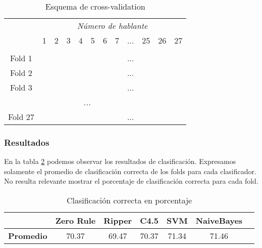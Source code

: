 \begin{table}[H]
	\centering
	\begin{tabular}{cccccccccccc}
		& \multicolumn{11}{c}{\textit{Número de hablante}} \\
		& 1 & 2 & 3 & 4 & 5 & 6 & 7 & ... & 25 & 26 & 27 \\
		\hline \\
		Fold 1 &\mycirc[red] & \mycirc[blue] & \mycirc[blue]  & \mycirc[blue]  & \mycirc[blue]  & \mycirc[blue]  & \mycirc[blue] & ... & \mycirc[blue] & \mycirc[blue] & \mycirc[blue]  \\
		
		Fold 2 &\mycirc[blue] & \mycirc[red] & \mycirc[blue]  & \mycirc[blue]  & \mycirc[blue]  & \mycirc[blue]  & \mycirc[blue] & ... & \mycirc[blue] & \mycirc[blue] & \mycirc[blue]  \\
		
		Fold 3 &\mycirc[blue] & \mycirc[blue] & \mycirc[red]  & \mycirc[blue]  & \mycirc[blue]  & \mycirc[blue]  & \mycirc[blue] & ... & \mycirc[blue] & \mycirc[blue] & \mycirc[blue]  \\
	
		\multicolumn{11}{c}{\textit{...}}	\\
		
		Fold 27 &\mycirc[blue] & \mycirc[blue] & \mycirc[blue]  & \mycirc[blue]  & \mycirc[blue]  & \mycirc[blue]  & \mycirc[blue] & ... & \mycirc[blue] & \mycirc[blue] & \mycirc[red]   \\
	
	\end{tabular}
	\caption{Esquema de cross-validation}
	\label{HPTDT_esq_cv}
\end{table}
		
\subsubsection{Resultados}

En la tabla \ref{HPTDT_clas_xval_porHab} podemos observar los resultados de clasificación. Expresamos solamente el promedio de clasificación correcta de los folds para cada clasificador. No resulta relevante mostrar el porcentaje de clasificación correcta para cada fold. 

\begin{table}[H]
	\centering
	\begin{tabular}{|l|c|c|c|c|c|c|}
		\hline
		\textbf{}  & \textbf{Zero Rule} & \textbf{Ripper} & \textbf{C4.5} & \textbf{SVM} & \textbf{NaiveBayes} \\ \hline
		\textbf{Promedio} & 70.37  & 69.47 & 70.37 & 71.34 & 71.46 \\ \hline
	\end{tabular}
	\caption{Clasificación correcta en porcentaje}
	\label{HPTDT_clas_xval_porHab}
\end{table}

